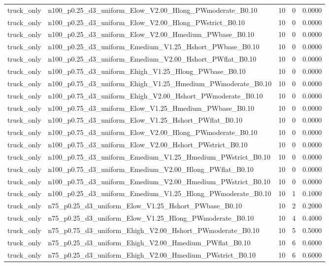 \begin{tabular}{llrrr}
truck_only & n100_p0.25_d3_uniform_Elow_V2.00_Hlong_PWmoderate_B0.10 & 10 & 0 & 0.0000 \\
truck_only & n100_p0.25_d3_uniform_Elow_V2.00_Hlong_PWstrict_B0.10 & 10 & 0 & 0.0000 \\
truck_only & n100_p0.25_d3_uniform_Elow_V2.00_Hmedium_PWbase_B0.10 & 10 & 0 & 0.0000 \\
truck_only & n100_p0.25_d3_uniform_Emedium_V1.25_Hshort_PWbase_B0.10 & 10 & 0 & 0.0000 \\
truck_only & n100_p0.25_d3_uniform_Emedium_V2.00_Hshort_PWflat_B0.10 & 10 & 0 & 0.0000 \\
truck_only & n100_p0.75_d3_uniform_Ehigh_V1.25_Hlong_PWbase_B0.10 & 10 & 0 & 0.0000 \\
truck_only & n100_p0.75_d3_uniform_Ehigh_V1.25_Hmedium_PWmoderate_B0.10 & 10 & 0 & 0.0000 \\
truck_only & n100_p0.75_d3_uniform_Ehigh_V2.00_Hshort_PWmoderate_B0.10 & 10 & 0 & 0.0000 \\
truck_only & n100_p0.75_d3_uniform_Elow_V1.25_Hmedium_PWbase_B0.10 & 10 & 0 & 0.0000 \\
truck_only & n100_p0.75_d3_uniform_Elow_V1.25_Hshort_PWflat_B0.10 & 10 & 0 & 0.0000 \\
truck_only & n100_p0.75_d3_uniform_Elow_V2.00_Hlong_PWmoderate_B0.10 & 10 & 0 & 0.0000 \\
truck_only & n100_p0.75_d3_uniform_Elow_V2.00_Hshort_PWstrict_B0.10 & 10 & 0 & 0.0000 \\
truck_only & n100_p0.75_d3_uniform_Emedium_V1.25_Hmedium_PWstrict_B0.10 & 10 & 0 & 0.0000 \\
truck_only & n100_p0.75_d3_uniform_Emedium_V2.00_Hlong_PWflat_B0.10 & 10 & 0 & 0.0000 \\
truck_only & n100_p0.75_d3_uniform_Emedium_V2.00_Hmedium_PWstrict_B0.10 & 10 & 0 & 0.0000 \\
truck_only & n100_p0.25_d3_uniform_Emedium_V1.25_Hlong_PWmoderate_B0.10 & 10 & 1 & 0.1000 \\
truck_only & n75_p0.25_d3_uniform_Elow_V1.25_Hshort_PWbase_B0.10 & 10 & 2 & 0.2000 \\
truck_only & n75_p0.25_d3_uniform_Elow_V1.25_Hlong_PWmoderate_B0.10 & 10 & 4 & 0.4000 \\
truck_only & n75_p0.75_d3_uniform_Ehigh_V2.00_Hshort_PWmoderate_B0.10 & 10 & 5 & 0.5000 \\
truck_only & n75_p0.25_d3_uniform_Ehigh_V2.00_Hmedium_PWflat_B0.10 & 10 & 6 & 0.6000 \\
truck_only & n75_p0.25_d3_uniform_Ehigh_V2.00_Hmedium_PWstrict_B0.10 & 10 & 6 & 0.6000 \\

\end{tabular}
